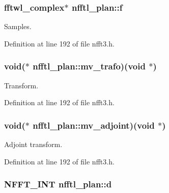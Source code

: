 \hypertarget{structnfftl__plan_a53b53a1222f4acf29c778b933c9f130e}{
\subsubsection[{f}]{\setlength{\rightskip}{0pt plus 5cm}fftwl\-\_\-complex$\ast$ nfftl\-\_\-plan\-::f}}\label{structnfftl__plan_a53b53a1222f4acf29c778b933c9f130e}


Samples. 



Definition at line 192 of file nfft3.\-h.

\hypertarget{structnfftl__plan_a0f05caab33b6f473626e74f44356e3fc}{
\subsubsection[{mv\-\_\-trafo}]{\setlength{\rightskip}{0pt plus 5cm}void($\ast$ nfftl\-\_\-plan\-::mv\-\_\-trafo)(void $\ast$)}}\label{structnfftl__plan_a0f05caab33b6f473626e74f44356e3fc}


Transform. 



Definition at line 192 of file nfft3.\-h.

\hypertarget{structnfftl__plan_a3d343b79e00dbb8cd4984143a03ddf53}{
\subsubsection[{mv\-\_\-adjoint}]{\setlength{\rightskip}{0pt plus 5cm}void($\ast$ nfftl\-\_\-plan\-::mv\-\_\-adjoint)(void $\ast$)}}\label{structnfftl__plan_a3d343b79e00dbb8cd4984143a03ddf53}


Adjoint transform. 



Definition at line 192 of file nfft3.\-h.

\hypertarget{structnfftl__plan_a01bfcdd90c108c461c37f655821e630a}{
\subsubsection[{d}]{\setlength{\rightskip}{0pt plus 5cm}N\-F\-F\-T\-\_\-\-I\-N\-T nfftl\-\_\-plan\-::d}}\label{structnfftl__plan_a01bfcdd90c108c461c37f655821e630a}


